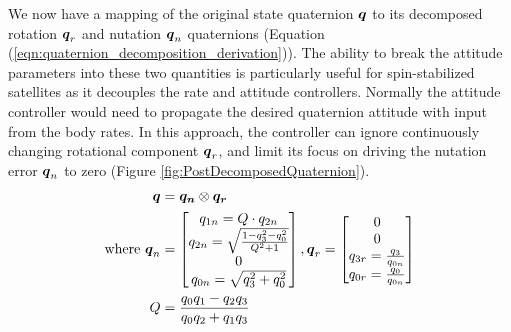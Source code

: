 We now have a mapping of the original state quaternion $\boldsymbol{q}$ to its decomposed rotation $\boldsymbol{q}_r$ and nutation $\boldsymbol{q}_n$ quaternions (Equation (\ref{eqn:quaternion_decomposition_derivation})).  The ability to break the attitude parameters into these two quantities is particularly useful for spin-stabilized satellites as it decouples the rate and attitude controllers.  Normally the attitude controller would need to propagate the desired quaternion attitude with input from the body rates. In this approach, the controller can ignore continuously changing rotational component $\boldsymbol{q}_r$, and limit its focus on driving the nutation error $\boldsymbol{q}_n$ to zero (Figure \ref{fig:PostDecomposedQuaternion}).
\begin{equation}
  \begin{aligned}
    \boldsymbol{q} &= \boldsymbol{q_n} \otimes \boldsymbol{q_r} \\
    \text{where } \boldsymbol{q}_n &= \begin{bmatrix} q_{1n} = Q \cdot q_{2n} \\ q_{2n} = \sqrt{ \frac{1  - q_3^2 - q_0^2}{Q^2 + 1} } \\ 0 \\ q_{0n} = \sqrt{q_3^2 + q_0^2} \end{bmatrix} , \boldsymbol{q}_r = \begin{bmatrix} 0 \\ 0 \\ q_{3r} = \frac{q_3}{q_{0n}} \\ q_{0r} = \frac{q_0}{q_{0n}} \end{bmatrix} \\
    Q &= \frac{q_{0}q_{1} - q_{2}q_{3}}{q_{0}q_{2} + q_{1}q_{3}}
  \end{aligned}
  \label{eqn:quaternion_decomposition_derivation}
\end{equation}
